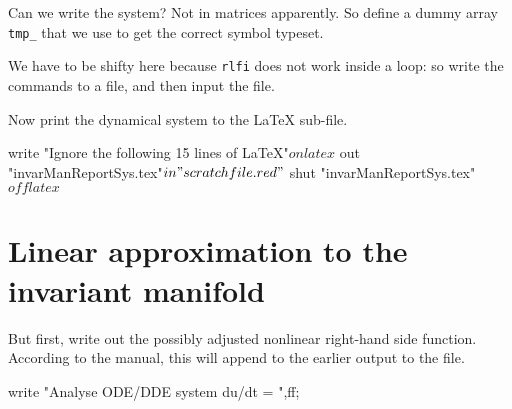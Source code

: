 \documentclass[11pt,a5paper]{article}
\begin{document}
Can we write the system? Not in matrices apparently. So
define a dummy array \verb|tmp_| that we use to get the
correct symbol typeset.

We have to be shifty here because \verb|rlfi| does not work
inside a loop: so write the commands to a file, and then
input the file.

Now print the dynamical system to the LaTeX sub-file.
\begin{reduce}
write "Ignore the following 15 lines of LaTeX"$
on latex$
out "invarManReportSys.tex"$
in "scratchfile.red"$
shut "invarManReportSys.tex"$
off latex$
\end{reduce}







\section{Linear approximation to the invariant manifold}

But first, write out the possibly adjusted nonlinear
right-hand side function. According to the manual, this will
append to the earlier output to the file.
\begin{reduce}
write "Analyse ODE/DDE system du/dt = ",ff;
\end{reduce}
\end{document}
